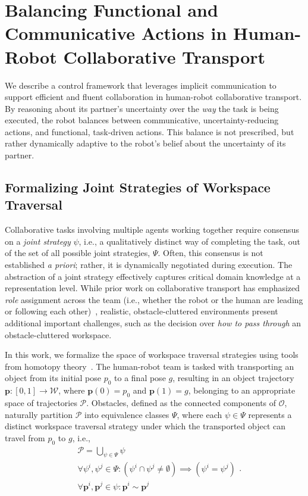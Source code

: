 \section{Balancing Functional and Communicative Actions in Human-Robot Collaborative Transport}

We describe a control framework that leverages implicit communication to support efficient and fluent collaboration in human-robot collaborative transport. By reasoning about its partner's uncertainty over the \emph{way} the task is being executed, the robot balances between communicative, uncertainty-reducing actions, and functional, task-driven actions. This balance is not prescribed, but rather dynamically adaptive to the robot's belief about the uncertainty of its partner.


\subsection{Formalizing Joint Strategies of Workspace Traversal}

Collaborative tasks involving multiple agents working together require consensus on a \emph{joint strategy} $\psi$, i.e., a qualitatively distinct way of completing the task, out of the set of all possible joint strategies, $\Psi$. Often, this consensus is not established \textit{a priori}; rather, it is dynamically negotiated during execution. The abstraction of a joint strategy effectively captures critical domain knowledge at a representation level. While prior work on collaborative transport has emphasized \emph{role} assignment across the team (i.e., whether the robot or the human are leading or following each other)~\citep{mortl2012role, nikolaidis2013human, jarrasse2014slaves}, realistic, obstacle-cluttered environments present additional important challenges, such as the decision over \emph{how to pass through} an obstacle-cluttered workspace.

In this work, we formalize the space of workspace traversal strategies using tools from homotopy theory~\citep{knepper2012equivalence}. The human-robot team is tasked with transporting an object from its initial pose $p_0$ to a final pose $g$, resulting in an object trajectory $\boldsymbol{p}:[0,1]\to\mathcal{W}$, where $\boldsymbol{p}(0)=p_0$ and $\boldsymbol{p}(1)=g$, belonging to an appropriate space of trajectories $\mathcal{P}$.
Obstacles, defined as the connected components of $\mathcal{O}$, naturally partition $\mathcal{P}$ into equivalence classes $\Psi$, where each $\psi\in\Psi$ represents a distinct workspace traversal strategy under which the transported object can travel from $p_0$ to $g$, i.e.,
\begin{equation}
    \begin{split}
    & \mathcal{P} = \underset{\psi \in \Psi}{\bigcup} \psi \\
    & \forall \psi^i, \psi^j \in \Psi : (\psi^i \cap \psi^j \neq \emptyset) \implies (\psi^i = \psi^j) \\
    & \forall \boldsymbol{p}^i, \boldsymbol{p}^j \in \psi : \boldsymbol{p}^i \sim \boldsymbol{p}^j
    \end{split}
    \mbox{.}
\end{equation}


